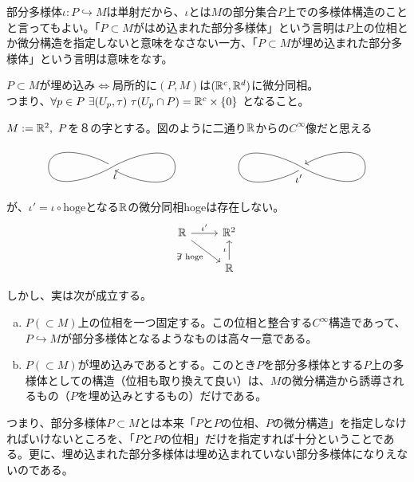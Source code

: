 部分多様体$\iota:P\hookrightarrow M$は単射だから、$\iota$とは$M$の部分集合$P$上での多様体構造のことと言ってもよい。「$P\subset M$がはめ込まれた部分多様体」という言明は$P$上の位相とか微分構造を指定しないと意味をなさない一方、「$P\subset M$が埋め込まれた部分多様体」という言明は意味をなす。
\begin{rem}[埋め込みの特徴付け]
    $P\subset M$が埋め込み$\iff$局所的に$(P,M)$は$(\mathbb{R}^c,\mathbb{R}^d)$に微分同相。\\
    つまり、$\forall p\in P\ \exists(U_p,\tau)\ \tau(U_p\cap P)=\R^c\times\{0\}$ となること。
\end{rem}
\begin{eg}[複数の位相が入る部分多様体]
    $M:=\R^2,\ P$を８の字とする。図のように二通り$\mathbb{R}$からの$C^\infty$像だと思える
    \[\begin{tikzpicture}
        \draw (-3-0.1,0.1) to [out=150,in=90] (-3-2,0);
        \draw (-3-2,0) to [out=-90,in=-150] (-3,0);
        \draw (-3,0) to [out=30,in=90] (-3+2,0);
        \draw[->] (-3+2,0) to [out=-90,in=-30] (-3+0.1,-0.1)node[below]{$\iota$};
        
        \draw (3-0.1,-0.1)node[below]{$\iota'$} to [out=-150,in=-90] (3-2,0);
        \draw (3-2,0) to [out=90,in=150] (3,0);
        \draw (3,0) to [out=-30,in=-90] (3+2,0);
        \draw[->] (3+2,0) to [out=90,in=30] (3+0.1,0.1);
    \end{tikzpicture}\]
    が、$\iota'=\iota\circ\text{hoge}$となる$\mathbb{R}$の微分同相hogeは存在しない。
    \[\begin{tikzcd}
        \R\arrow[dr,"\not\exists\ \text{hoge}"'] \arrow[r,"\iota'"] & \R^2\\
	&	\R\arrow[u,"\iota"]
    \end{tikzcd}\]
\end{eg}
しかし、実は次が成立する。
\begin{prop}\label{prop:111}
	\begin{enumerate}[(a)]
		\item $P(\subset M)$上の位相を一つ固定する。この位相と整合する$C^\infty$構造であって、$P\hookrightarrow M$が部分多様体となるようなものは高々一意である。
		\item $P(\subset M)$が埋め込みであるとする。このとき$P$を部分多様体とする$P$上の多様体としての構造（位相も取り換えて良い）は、$M$の微分構造から誘導されるもの（$P$を埋め込みとするもの）だけである。
	\end{enumerate}
	つまり、部分多様体$P\subset M$とは本来「$P$と$P$の位相、$P$の微分構造」を指定しなければいけないところを、「$P$と$P$の位相」だけを指定すれば十分ということである。更に、埋め込まれた部分多様体は埋め込まれていない部分多様体になりえないのである。
\end{prop}
